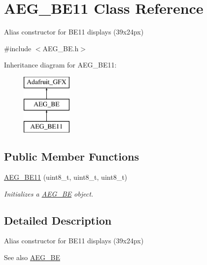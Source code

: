 \hypertarget{class_a_e_g___b_e11}{}\section{A\+E\+G\+\_\+\+B\+E11 Class Reference}
\label{class_a_e_g___b_e11}


Alias constructor for B\+E11 displays (39x24px)  




{\ttfamily \#include $<$A\+E\+G\+\_\+\+B\+E.\+h$>$}

Inheritance diagram for A\+E\+G\+\_\+\+B\+E11\+:\begin{figure}[H]
\begin{center}
\leavevmode
\includegraphics[height=3.000000cm]{class_a_e_g___b_e11}
\end{center}
\end{figure}
\subsection*{Public Member Functions}
\begin{DoxyCompactItemize}
\item 
\mbox{\hyperlink{class_a_e_g___b_e11_addb3a2e7c180491a65374fdef38f67da}{A\+E\+G\+\_\+\+B\+E11}} (uint8\+\_\+t, uint8\+\_\+t, uint8\+\_\+t)
\begin{DoxyCompactList}\small\item\em Initializes a {\ttfamily \mbox{\hyperlink{class_a_e_g___b_e}{A\+E\+G\+\_\+\+BE}}} object. \end{DoxyCompactList}\end{DoxyCompactItemize}


\subsection{Detailed Description}
Alias constructor for B\+E11 displays (39x24px) 

\begin{DoxySeeAlso}{See also}
\mbox{\hyperlink{class_a_e_g___b_e}{A\+E\+G\+\_\+\+BE}} 
\end{DoxySeeAlso}


